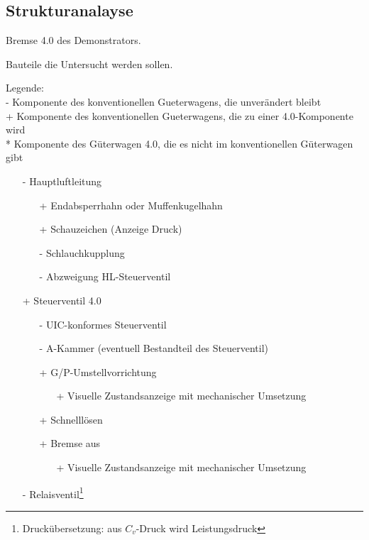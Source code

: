\subsection{Strukturanalayse}
\gls{Bremse 4.0} des Demonstrators.\par
Bauteile die Untersucht werden sollen.\par
Legende: \\
- Komponente des konventionellen \gls{Gueterwagen}s, die unverändert bleibt\\
+ Komponente des konventionellen \gls{Gueterwagen}s, die zu einer 4.0-Komponente wird\\
\** Komponente des Güterwagen 4.0, die es nicht im konventionellen Güterwagen gibt\par
\begin{itemize}
    \item[-] Hauptluftleitung
    \begin{itemize}
        \item[+] Endabsperrhahn oder Muffenkugelhahn
        \item[+] Schauzeichen (Anzeige Druck)
        \item[-] Schlauchkupplung
        \item[-] Abzweigung HL-Steuerventil
    \end{itemize}
    \item[+] Steuerventil 4.0
    \begin{itemize}
        \item[-] UIC-konformes Steuerventil
        \item[-] A-Kammer (eventuell Bestandteil des Steuerventil)
        \item[+] G/P-Umstellvorrichtung
        \begin{itemize}
            \item[+] Visuelle Zustandsanzeige mit mechanischer Umsetzung
        \end{itemize}
        \item[+] Schnelllösen
        \item[+] Bremse aus
        \begin{itemize}
            \item[+] Visuelle Zustandsanzeige mit mechanischer Umsetzung
        \end{itemize}
    \end{itemize}
    \item[-] Relaisventil\footnote{Druckübersetzung: aus $C_v$-Druck wird Leistungsdruck}
    \begin{itemize}

\end{itemize}
\end{itemize}

